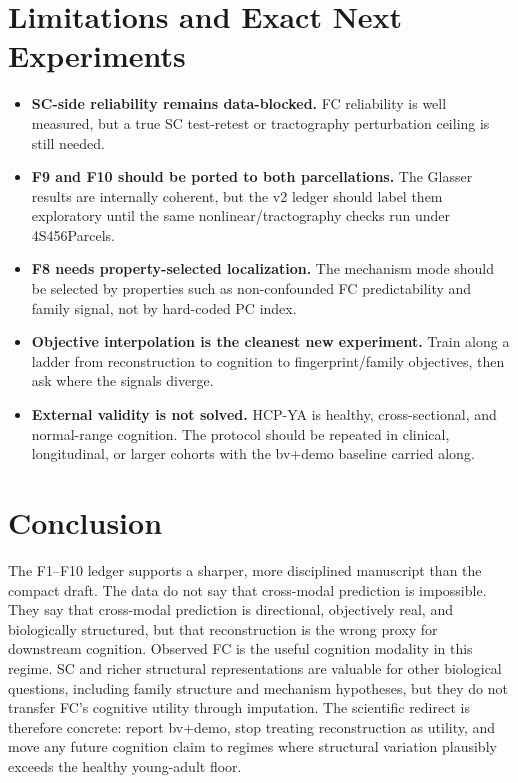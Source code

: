 \documentclass{article}
\begin{document}
\section{Limitations and Exact Next Experiments}

\begin{itemize}
\item \textbf{SC-side reliability remains data-blocked.} FC reliability is well
measured, but a true SC test-retest or tractography perturbation ceiling is still needed.
\item \textbf{F9 and F10 should be ported to both parcellations.} The Glasser results
are internally coherent, but the v2 ledger should label them exploratory until the same
nonlinear/tractography checks run under 4S456Parcels.
\item \textbf{F8 needs property-selected localization.} The mechanism mode should be
selected by properties such as non-confounded FC predictability and family signal, not by
hard-coded PC index.
\item \textbf{Objective interpolation is the cleanest new experiment.} Train along a
ladder from reconstruction to cognition to fingerprint/family objectives, then ask where
the signals diverge.
\item \textbf{External validity is not solved.} HCP-YA is healthy, cross-sectional, and
normal-range cognition. The protocol should be repeated in clinical, longitudinal, or
larger cohorts with the bv+demo baseline carried along.
\end{itemize}

\section{Conclusion}

The F1--F10 ledger supports a sharper, more disciplined manuscript than the compact draft.
The data do not say that cross-modal prediction is impossible. They say that cross-modal
prediction is directional, objectively real, and biologically structured, but that
reconstruction is the wrong proxy for downstream cognition. Observed FC is the useful
cognition modality in this regime. SC and richer structural representations are valuable
for other biological questions, including family structure and mechanism hypotheses, but
they do not transfer FC's cognitive utility through imputation. The scientific redirect is
therefore concrete: report bv+demo, stop treating reconstruction as utility, and move any
future cognition claim to regimes where structural variation plausibly exceeds the healthy
young-adult floor.
\end{document}
